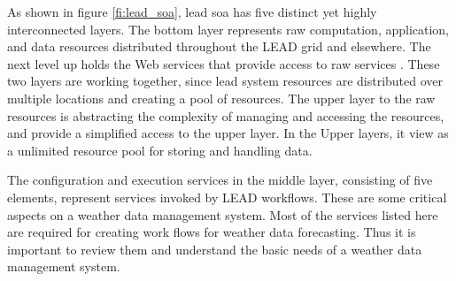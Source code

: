 As shown in figure \ref{fi:lead_soa}, \acrshort{lead} \acrshort{soa} has five distinct yet highly interconnected layers. 
The bottom layer represents raw computation, application, and data resources distributed throughout the LEAD grid and elsewhere. The next level up holds the Web services that provide access to raw services \cite{Droegemeier2005Service-OrientedWeather}. These two layers are working together, since \acrshort{lead} system resources are distributed over multiple locations and creating a pool of resources. The upper layer to the raw resources is abstracting the complexity of managing and accessing the resources, and provide a simplified access to the upper layer. In the Upper layers, it view as a unlimited resource pool for storing and handling data.

The configuration and execution services in the middle layer, consisting of five elements, represent services invoked by LEAD workflows. These are some critical aspects on a weather data management system. Most of the services listed here are required for creating work flows for weather data forecasting. Thus it is important to review them and understand the basic needs of a weather data management system.

